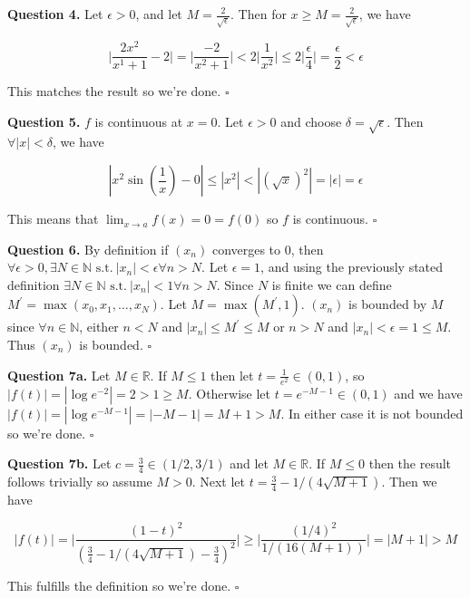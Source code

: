 \documentclass[letterpaper, reqno,11pt]{article}
\newcommand{\RR}{\mathbb{R}}
\newcommand{\NN}{\mathbb{N}}
\newcommand{\st}{\text{ s.t.}\ }
\begin{document}
{\noindent\bf Question 4.} Let $\epsilon>0$, and let $M=\frac2{\sqrt\epsilon}$. Then for $x\geq M=\frac2{\sqrt\epsilon}$, we have 

$$
    \bigg|\frac{2x^2}{x^1+1}-2\bigg|=\bigg|\frac{-2}{x^2+1}\bigg|< 2\bigg|\frac1{x^2}\bigg|\leq2\bigg|\frac{\epsilon}{4}\bigg|=\frac\epsilon2<\epsilon
$$

This matches the result so we're done. $\square$

{\noindent\bf Question 5.} $f$ is continuous at $x=0$. Let $\epsilon>0$ and choose $\delta=\sqrt\epsilon$. Then $\forall|x|<\delta$, we have 

$$
    |x^2\sin(\frac1x)-0|\leq |x^2|<|(\sqrt x)^2|=|\epsilon|=\epsilon
$$

This means that $\lim_{x\to a}f(x)=0=f(0)$ so $f$ is continuous. $\square$


{\noindent\bf Question 6.} By definition if $(x_n)$ converges to 0, then $\forall \epsilon>0, \exists N\in\NN\st |x_n|<\epsilon\forall n>N$. Let $\epsilon=1$, and using the previously stated definition $\exists N\in\NN\st |x_n|<1\forall n>N$. Since $N$ is finite we can define $M^\prime=\max(x_0, x_1, \ldots, x_N)$. Let $M=\max(M^\prime, 1)$. $(x_n)$ is bounded by $M$ since $\forall n\in\NN$, either $n<N$ and $|x_n|\leq M^\prime\leq M$ or $n>N$ and $|x_n|<\epsilon=1\leq M$. Thus $(x_n)$ is bounded. $\square$

{\noindent\bf Question 7a.} Let $M\in\RR$. If $M\leq1$ then let $t=\frac{1}{e^2}\in(0, 1)$, so $|f(t)|=|\log e^{-2}|=2>1\geq M$. Otherwise let $t=e^{-M-1}\in(0, 1)$ and we have $|f(t)|=|\log e^{-M-1}|=|-M-1|=M+1>M$. In either case it is not bounded so we're done. $\square$

{\noindent\bf Question 7b.} Let $c=\frac34\in(1/2, 3/1)$ and let $M\in\RR$. If $M\leq0$ then the result follows trivially so assume $M>0$. Next let $t=\frac34-1/(4\sqrt{M+1})$. Then we have 

$$
    |f(t)|=\bigg|\frac{(1-t)^2}{(\frac34-1/(4\sqrt{M+1})-\frac34)^2}\bigg|\geq \bigg|\frac{(1/4)^2}{1/(16(M+1))}\bigg|=|M+1|>M
$$

This fulfills the definition so we're done. $\square$
\end{document}
